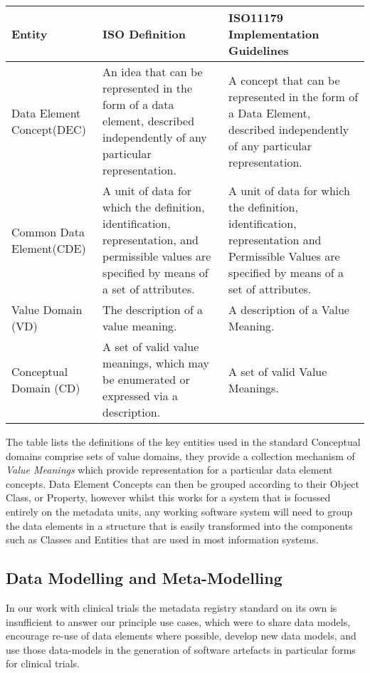 \begin{table}[h]
	\begin{tabular}{ p{1.8cm} p{2.8cm}  p{3.0cm}  }  %
		\hline
		Entity & ISO Definition & ISO11179 Implementation Guidelines  \\ 
		\hline
		Data Element Concept(DEC) & An idea that can be represented in the form of a data element, described independently of any particular representation. & A concept that can be represented in the form of a Data Element, described independently of any particular representation.\\
		Common Data Element(CDE) & A unit of data for which the definition, identification, representation, and permissible values are specified by means of a set of attributes. & A unit of data for which the definition, identification, representation and Permissible Values are specified by means of a set of attributes. \\
		Value Domain (VD) & The description of a value meaning. & A description of a Value Meaning. \\
		Conceptual Domain (CD) & A set of valid value meanings, which may be enumerated or expressed via a description.& A set of valid Value Meanings.\\
		\hline
	\end{tabular}
\end{table}

The table lists the definitions of the key entities used in the standard
Conceptual domains comprise sets of value domains, they provide a collection mechanism of \emph{Value Meanings} which provide representation for a particular data element concepts. Data Element Concepts can then be grouped according to their Object Class, or Property, however whilst this works for a system that is focussed entirely on the metadata units, any working software system will need to group the data elements in a structure that is easily transformed into the components such as Classes and Entities that are used in most information systems.   



\subsection{Data Modelling and Meta-Modelling}
In our work with clinical trials the metadata registry standard on its own is insufficient to answer our principle use cases, which were to share data models, encourage re-use of data elements where possible, develop new data models, and use those data-models in the generation of software artefacts in particular forms for clinical trials.

